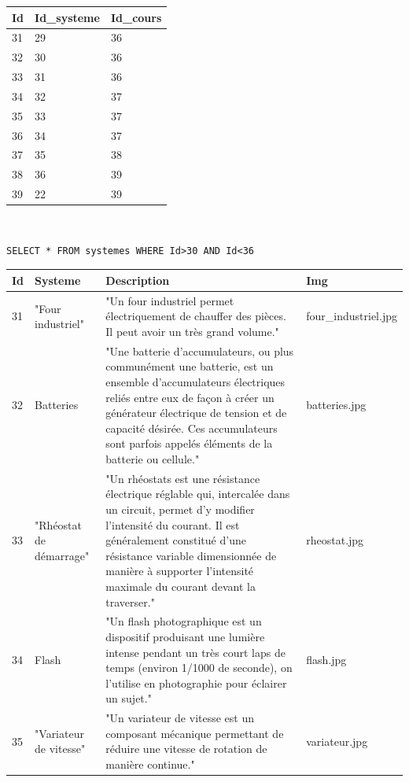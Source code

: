 \begin{center}
\begin{tabular}{|p{0.5cm}|p{2cm}|p{2cm}|}
\hline
\textbf{Id} & Id\_systeme & Id\_cours \\ \hline
31 & 29 & 36 \\ \hline
32 & 30 & 36 \\ \hline
33 & 31 & 36 \\ \hline
34 & 32 & 37 \\ \hline
35 & 33 & 37 \\ \hline
36 & 34 & 37 \\ \hline
37 & 35 & 38 \\ \hline
38 & 36 & 39 \\ \hline
39 & 22 & 39 \\ \hline
\end{tabular}
\end{center}

~\

\begin{GrayBox}[0.85\textwidth]
\begin{verbatim}SELECT * FROM systemes WHERE Id>30 AND Id<36
\end{verbatim}
\end{GrayBox}

\begin{center}
\begin{tabular}{|p{1cm}|p{3cm}|p{6cm}|p{4cm}|}
\hline
Id & Systeme & Description & Img \\ \hline
31 & "Four industriel" & "Un four industriel permet électriquement de chauffer des pièces. Il peut avoir un très grand volume." & four\_industriel.jpg \\ \hline
32 & Batteries & "Une batterie d'accumulateurs, ou plus communément une batterie, est un ensemble d'accumulateurs électriques reliés entre eux de façon à créer un générateur électrique de tension et de capacité désirée. Ces accumulateurs sont parfois appelés éléments de la batterie ou cellule." & batteries.jpg \\ \hline
33 & "Rhéostat de démarrage" & "Un rhéostats est une résistance électrique réglable qui, intercalée dans un circuit, permet d'y modifier l'intensité du courant. Il est généralement constitué d'une résistance variable dimensionnée de manière à supporter l'intensité maximale du courant devant la traverser." & rheostat.jpg \\ \hline
34 & Flash & "Un flash photographique est un dispositif produisant une lumière intense pendant un très court laps de temps (environ 1/1000 de seconde), on l'utilise en photographie pour éclairer un sujet." & flash.jpg  \\ \hline
35 & "Variateur de vitesse" & "Un variateur de vitesse est un composant mécanique permettant de réduire une vitesse de rotation de manière continue." & variateur.jpg  \\ \hline
\end{tabular}
\end{center}

